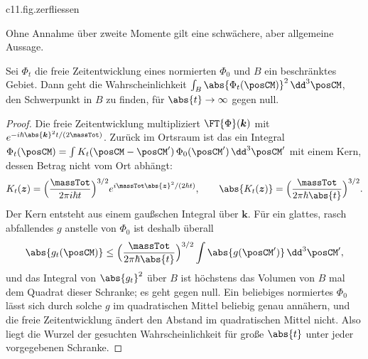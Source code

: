 \begin{vertiefung}
  \begin{tpcfigure}{c11.fig.zerfliessen}
    \caption{Die Breite eines freien Schwerpunktpakets nach \eqref{c11.eq.varianz},
      bezogen auf die Anfangsbreite. Waagerecht die Zeit, gemessen in Einheiten von
      $\massTot\sqrt{\Var\posCM(0)}/\sqrt{\Var\boldsymbol{P}}$. Die Zahl $k$ ist der
      Erwartungswert im mittleren Term von \eqref{c11.eq.varianz}, geteilt durch
      $2\sqrt{\Var\posCM(0)\,\Var\boldsymbol{P}}$. Durchgezogen: $k = 0$. Gestrichelt:
      ein Paket mit $k < 0$, das erst schmaler und dann breiter wird; der Punkt markiert
      seine kleinste Breite. Dünn: eine Gerade mit der gemeinsamen asymptotischen
      Steigung.}
  \end{tpcfigure}

  Ohne Annahme über zweite Momente gilt eine schwächere, aber allgemeine Aussage.

  \begin{proposition}\label{c11.prop.zerfliessen}
    Sei $\Phi_t$ die freie Zeitentwicklung eines normierten $\Phi_0$ und $B$ ein
    beschränktes Gebiet. Dann geht die Wahrscheinlichkeit
    $\int_B \abs{\Phi_t(\posCM)}^2 \,\dd^3\posCM$, den Schwerpunkt in $B$ zu finden, für
    $\abs{t} \to \infty$ gegen null.
  \end{proposition}
  \begin{proof}
    Die freie Zeitentwicklung multipliziert $\FT{\Phi}(\boldsymbol{k})$ mit
    $e^{-i\hbar\abs{\boldsymbol{k}}^2 t/(2\massTot)}$. Zurück im Ortsraum ist das ein
    Integral $\Phi_t(\posCM) = \int K_t(\posCM - \posCM')\,\Phi_0(\posCM')\,\dd^3\posCM'$
    mit einem Kern, dessen Betrag nicht vom Ort abhängt:
    \begin{equation}\label{c11.eq.freikern}
      K_t(\boldsymbol{z}) = \Bigl(\frac{\massTot}{2\pi i\hbar t}\Bigr)^{3/2}
        e^{i\massTot\abs{\boldsymbol{z}}^2/(2\hbar t)},
      \qquad
      \abs{K_t(\boldsymbol{z})} = \Bigl(\frac{\massTot}{2\pi\hbar\abs{t}}\Bigr)^{3/2}.
    \end{equation}
    Der Kern entsteht aus einem gaußschen Integral über $\boldsymbol{k}$. Für ein
    glattes, rasch abfallendes $g$ anstelle von $\Phi_0$ ist deshalb überall
    \begin{equation}\label{c11.eq.schranke}
      \abs{g_t(\posCM)} \leq \Bigl(\frac{\massTot}{2\pi\hbar\abs{t}}\Bigr)^{3/2}
        \int \abs{g(\posCM')}\,\dd^3\posCM' ,
    \end{equation}
    und das Integral von $\abs{g_t}^2$ über $B$ ist höchstens das Volumen von $B$ mal
    dem Quadrat dieser Schranke; es geht gegen null. Ein beliebiges normiertes $\Phi_0$
    lässt sich durch solche $g$ im quadratischen Mittel beliebig genau annähern, und die
    freie Zeitentwicklung ändert den Abstand im quadratischen Mittel nicht. Also liegt
    die Wurzel der gesuchten Wahrscheinlichkeit für große $\abs{t}$ unter jeder
    vorgegebenen Schranke.
  \end{proof}


\end{vertiefung}
